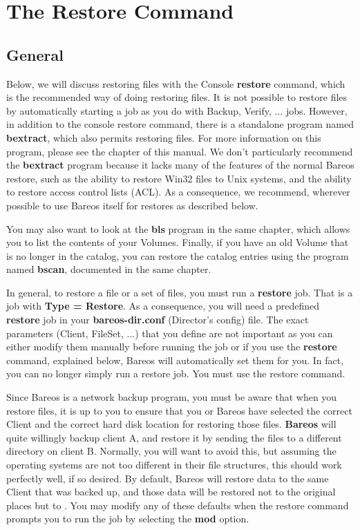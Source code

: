 \chapter{The Restore Command}
\label{RestoreChapter}
\label{_ConsoleChapter}

\section{General}

Below, we will discuss restoring files with the Console {\bf restore} command,
which is the recommended way of doing restoring files. It is not possible
to restore files by automatically starting a job as you do with Backup,
Verify, ... jobs.  However, in addition to the console restore command,
there is a standalone program named {\bf bextract}, which also permits
restoring files.  For more information on this program, please see the
 chapter of this manual. We
don't particularly recommend the {\bf bextract} program because it
lacks many of the features of the normal Bareos restore, such as the
ability to restore Win32 files to Unix systems, and the ability to
restore access control lists (ACL).  As a consequence, we recommend,
wherever possible to use Bareos itself for restores as described below.

You may also want to look at the {\bf bls} program in the same chapter,
which allows you to list the contents of your Volumes.  Finally, if you
have an old Volume that is no longer in the catalog, you can restore the
catalog entries using the program named {\bf bscan}, documented in the same
 chapter.

In general, to restore a file or a set of files, you must run a {\bf restore}
job. That is a job with {\bf Type = Restore}. As a consequence, you will need
a predefined {\bf restore} job in your {\bf bareos-dir.conf} (Director's
config) file. The exact parameters (Client, FileSet, ...) that you define are
not important as you can either modify them manually before running the job or
if you use the {\bf restore} command, explained below, Bareos will
automatically set them for you. In fact, you can no longer simply run a restore
job.  You must use the restore command.

Since Bareos is a network backup program, you must be aware that when you
restore files, it is up to you to ensure that you or Bareos have selected the
correct Client and the correct hard disk location for restoring those files.
{\bf Bareos} will quite willingly backup client A, and restore it by sending
the files to a different directory on client B. Normally, you will want to
avoid this, but assuming the operating systems are not too different in their
file structures, this should work perfectly well, if so desired.
By default, Bareos will restore data to the same Client that was backed
up, and those data will be restored not to the original places but to
.  You may modify any of these defaults when the
restore command prompts you to run the job by selecting the {\bf mod}
option.

